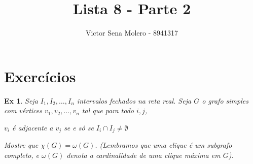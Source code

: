 \documentclass[12pt]{article}
\newcounter{exCounter}
\newtheorem{ex}[exCounter]{Ex}
\begin{document}
 
 
\title{Lista 8 - Parte 2}
\author{Victor Sena Molero - 8941317}
\maketitle

\section{Exercícios}
\begin{ex}
Seja $I_1, I_2, \dots, I_n$ intervalos fechados na reta real. Seja $G$ o grafo simples com vértices $v_1, v_2, \dots, v_n$ tal que para todo $i,j$,

$v_i$ é adjacente a $v_j$ se e só se $I_i \cap I_j \neq \emptyset$

Mostre que $\chi(G) = \omega(G)$. (Lembramos que uma \textit{clique} é um subgrafo completo, e $\omega(G)$ denota a cardinalidade de uma clique máxima em $G$).
\end{ex}
\end{document}
